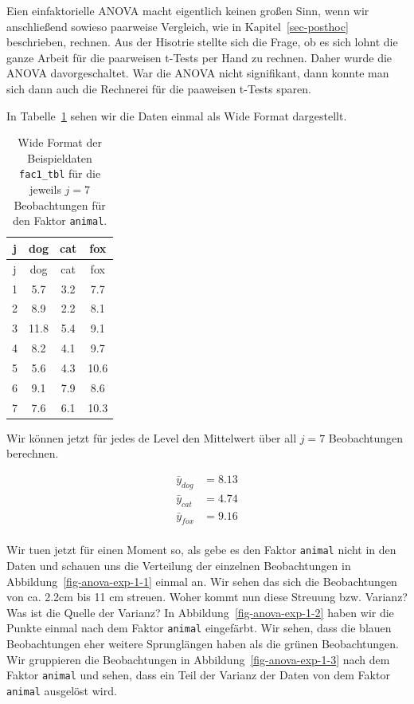 \documentclass[
  letterpaper,
]{scrbook}
\begin{document}
Eien einfaktorielle ANOVA macht eigentlich keinen großen Sinn, wenn wir
anschließend sowieso paarweise Vergleich, wie in
Kapitel~\ref{sec-posthoc} beschrieben, rechnen. Aus der Hisotrie stellte
sich die Frage, ob es sich lohnt die ganze Arbeit für die paarweisen
t-Tests per Hand zu rechnen. Daher wurde die ANOVA davorgeschaltet. War
die ANOVA nicht signifikant, dann konnte man sich dann auch die
Rechnerei für die paaweisen t-Tests sparen.

In Tabelle~\ref{tbl-fac1-wide-01} sehen wir die Daten einmal als Wide
Format dargestellt.

\hypertarget{tbl-fac1-wide-01}{}
\begin{longtable}[]{@{}cccc@{}}
\caption{\label{tbl-fac1-wide-01}Wide Format der Beispieldaten
\texttt{fac1\_tbl} für die jeweils \(j=7\) Beobachtungen für den Faktor
\texttt{animal}.}\tabularnewline
\toprule()
j & dog & cat & fox \\
\midrule()
\endfirsthead
\toprule()
j & dog & cat & fox \\
\midrule()
\endhead
1 & 5.7 & 3.2 & 7.7 \\
2 & 8.9 & 2.2 & 8.1 \\
3 & 11.8 & 5.4 & 9.1 \\
4 & 8.2 & 4.1 & 9.7 \\
5 & 5.6 & 4.3 & 10.6 \\
6 & 9.1 & 7.9 & 8.6 \\
7 & 7.6 & 6.1 & 10.3 \\
\bottomrule()
\end{longtable}

Wir können jetzt für jedes de Level den Mittelwert über all \(j=7\)
Beobachtungen berechnen.

\[
\begin{align*}
\bar{y}_{dog} &= 8.13 \\
\bar{y}_{cat} &= 4.74 \\
\bar{y}_{fox} &= 9.16 \\
\end{align*}
\]

Wir tuen jetzt für einen Moment so, als gebe es den Faktor
\texttt{animal} nicht in den Daten und schauen uns die Verteilung der
einzelnen Beobachtungen in Abbildung~\ref{fig-anova-exp-1-1} einmal an.
Wir sehen das sich die Beobachtungen von ca. 2.2cm bis 11 cm streuen.
Woher kommt nun diese Streuung bzw. Varianz? Was ist die Quelle der
Varianz? In Abbildung~\ref{fig-anova-exp-1-2} haben wir die Punkte
einmal nach dem Faktor \texttt{animal} eingefärbt. Wir sehen, dass die
blauen Beobachtungen eher weitere Sprunglängen haben als die grünen
Beobachtungen. Wir gruppieren die Beobachtungen in
Abbildung~\ref{fig-anova-exp-1-3} nach dem Faktor \texttt{animal} und
sehen, dass ein Teil der Varianz der Daten von dem Faktor
\texttt{animal} ausgelöst wird.
\end{document}
